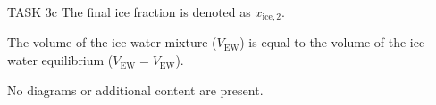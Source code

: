 TASK 3c  
The final ice fraction is denoted as \( x_{\text{ice},2} \).  

The volume of the ice-water mixture (\( V_{\text{EW}} \)) is equal to the volume of the ice-water equilibrium (\( V_{\text{EW}} = V_{\text{EW}} \)).  

No diagrams or additional content are present.